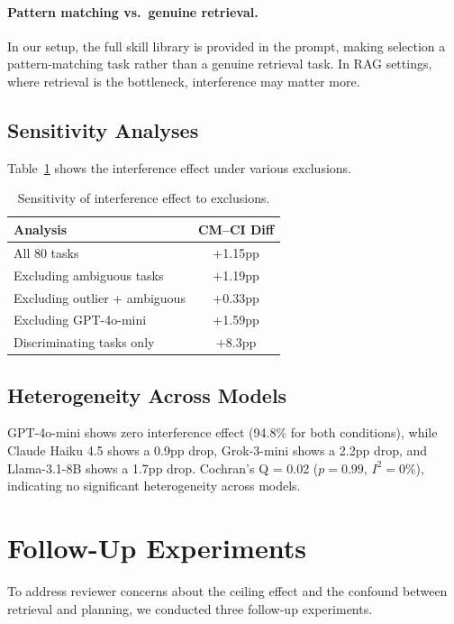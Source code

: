 \documentclass[11pt]{article}
\begin{document}
\paragraph{Pattern matching vs.\ genuine retrieval.} In our setup, the full skill library is provided in the prompt, making selection a pattern-matching task rather than a genuine retrieval task. In RAG settings, where retrieval is the bottleneck, interference may matter more.

\subsection{Sensitivity Analyses}

Table~\ref{tab:sensitivity} shows the interference effect under various exclusions.

\begin{table}[t]
\centering
\small
\begin{tabular}{lc}
\toprule
\textbf{Analysis} & \textbf{CM--CI Diff} \\
\midrule
All 80 tasks & +1.15pp \\
Excluding ambiguous tasks & +1.19pp \\
Excluding outlier + ambiguous & +0.33pp \\
Excluding GPT-4o-mini & +1.59pp \\
Discriminating tasks only & +8.3pp \\
\bottomrule
\end{tabular}
\caption{Sensitivity of interference effect to exclusions.}
\label{tab:sensitivity}
\end{table}

\subsection{Heterogeneity Across Models}

GPT-4o-mini shows zero interference effect (94.8\% for both conditions), while Claude Haiku 4.5 shows a 0.9pp drop, Grok-3-mini shows a 2.2pp drop, and Llama-3.1-8B shows a 1.7pp drop. Cochran's Q = 0.02 ($p = 0.99$, $I^2 = 0\%$), indicating no significant heterogeneity across models.

\section{Follow-Up Experiments}

To address reviewer concerns about the ceiling effect and the confound between retrieval and planning, we conducted three follow-up experiments.
\end{document}
